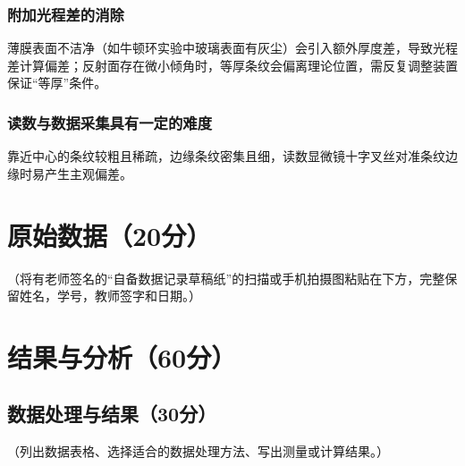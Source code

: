\documentclass[]{../../templates/Report}%
\begin{document}
\subsubsection{附加光程差的消除}
薄膜表面不洁净（如牛顿环实验中玻璃表面有灰尘）会引入额外厚度差，导致光程差计算偏差；反射面存在微小倾角时，等厚条纹会偏离理论位置，需反复调整装置保证“等厚”条件。

\subsubsection{读数与数据采集具有一定的难度}
靠近中心的条纹较粗且稀疏，边缘条纹密集且细，读数显微镜十字叉丝对准条纹边缘时易产生主观偏差。

\begin{fullreportonly}
\section{原始数据（20分）}
（将有老师签名的“自备数据记录草稿纸”的扫描或手机拍摄图粘贴在下方，完整保留姓名，学号，教师签字和日期。）

\section{结果与分析（60分）}
\subsection{数据处理与结果（30分）}
（列出数据表格、选择适合的数据处理方法、写出测量或计算结果。）

\end{fullreportonly}
\end{document}
